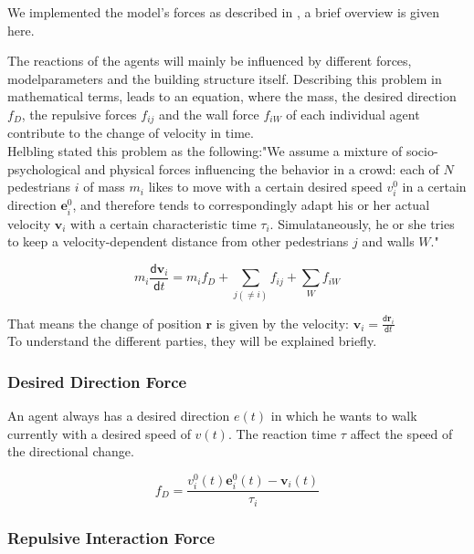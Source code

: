\documentclass[11pt]{article}
\begin{document}
We implemented the model's forces as described in \cite{SDFEP}, a brief overview is given here.

The reactions of the agents will mainly be influenced by different forces, modelparameters and the building structure itself.
Describing this problem in mathematical terms, leads to an equation, where the mass, the desired direction $f_{D}$, the repulsive forces $f_{ij}$ and the wall force $f_{iW}$ of each individual agent contribute to the change of velocity in time.\\
Helbling stated this problem as the following:"We assume a mixture of socio-psychological and physical forces influencing the behavior in a crowd: each of $N$ pedestrians $i$ of mass $m_{i}$ likes to move with a certain desired speed $v_{i}^0$ in a certain direction $\mathbf{e}_{i}^0$, and therefore tends to correspondingly adapt his or her actual velocity $\mathbf{v}_i$ with a certain characteristic time $\tau_{i}$. Simulataneously, he or she tries to keep a velocity-dependent distance from other pedestrians $j$ and walls $W$."

\begin{equation}
m_{i}\frac{\mathsf{d}\mathbf{v}_{i}}{\mathsf{d}t}=m_{i}f_{D}+\sum \limits_{j(\neq{i})}{f_{ij}}+\sum \limits_{W}{f_{iW}}
\end{equation}

That means the change of position $\mathbf{r}$ is given by the velocity: $\mathbf{v}_{i}=\frac{\mathsf{d}\mathbf{r}_{i}}{\mathsf{d}t}$\\
To understand the different parties, they will be explained briefly.

\subsubsection{Desired Direction Force}

An agent always has a desired direction $e(t)$ in which he wants to walk currently with a desired speed of $v(t)$. 
The reaction time $\tau$ affect the speed of the directional change.

\begin{equation}
f_{D}=\frac{v_{i}^{0}(t)\mathbf{e}_{i}^{0}(t)-\mathbf{v}_{i}(t)}{\tau_{i}}
\end{equation}

\subsubsection{Repulsive Interaction Force}
\end{document}
